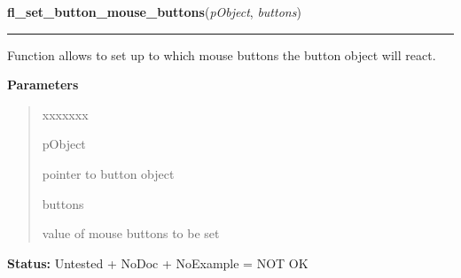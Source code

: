 \hspace{.8\funcindent}\begin{boxedminipage}{\funcwidth}

    \raggedright \textbf{fl\_set\_button\_mouse\_buttons}(\textit{pObject}, \textit{buttons})

    \vspace{-1.5ex}

    \rule{\textwidth}{0.5\fboxrule}
\setlength{\parskip}{2ex}
    Function allows to set up to which mouse buttons the button object will
    react.

\setlength{\parskip}{1ex}
      \textbf{Parameters}
      \vspace{-1ex}

      \begin{quote}
        \begin{Ventry}{xxxxxxx}

          \item[pObject]

          pointer to button object

          \item[buttons]

          value of mouse buttons to be set

        \end{Ventry}

      \end{quote}

\textbf{Status:} Untested + NoDoc + NoExample = NOT OK



    \end{boxedminipage}

    \label{xformslib:library:fl_get_button_mouse_buttons}

    \vspace{0.5ex}


